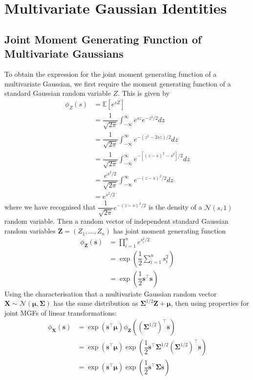 \documentclass[11pt]{report} %
\begin{document}
\section{Multivariate Gaussian Identities}

\subsection{Joint Moment Generating Function of Multivariate Gaussians}

To obtain the expression for the joint moment generating function of a multivariate Gaussian, we first require the moment generating function of a standard Gaussian random variable $Z$. This is given by
\begin{align}
\phi_{Z}\left(s\right) &= \mathbb{E}\left[e^{sZ}\right] \\
&= \dfrac{1}{\sqrt{2\pi}}\int_{-\infty}^{\infty}e^{sz}e^{-z^{2}/2}dz \\
&= \dfrac{1}{\sqrt{2\pi}}\int_{-\infty}^{\infty}e^{-\left(z^{2} - 2sz\right)/2}dz \\
&= \dfrac{1}{\sqrt{2\pi}}\int_{-\infty}^{\infty}e^{-\left[\left(z - s\right)^{2} - s^{2}\right]/2}dz \\
&= \dfrac{e^{s^{2}/2}}{\sqrt{2\pi}}\int_{-\infty}^{\infty}e^{-\left(z - s\right)^{2}/2}dz \\
&= e^{s^{2}/2}
\end{align}
where we have recognised that $\dfrac{1}{\sqrt{2\pi}}e^{-\left(z - s\right)^{2}/2}$ is the density of a $\mathcal{N}\left(s, 1\right)$ random variable. Then a random vector of independent standard Gaussian random variables $\mathbf{Z} = \left(Z_{1}, \dots, Z_{n}\right)$ has joint moment generating function
\begin{align}
\phi_{\mathbf{Z}}\left(\mathbf{s}\right) &= \prod_{i = 1}^{n}e^{s_{i}^{2}/2} \\
&= \exp\left(\dfrac{1}{2}\sum_{i = 1}^{n}s_{i}^{2}\right) \\
&= \exp\left(\dfrac{1}{2}\mathbf{s}^{\top}\mathbf{s}\right)
\end{align}
Using the characterisation that a multivariate Gaussian random vector $\mathbf{X} \sim \mathcal{N}\left(\boldsymbol{\mu}, \boldsymbol{\Sigma}\right)$ has the same distribution as $\boldsymbol{\Sigma}^{1/2}\mathbf{Z} + \boldsymbol{\mu}$, then using properties for joint MGFs of linear transformations:
\begin{align}
\phi_{\mathbf{X}}\left(\mathbf{s}\right) &= \exp\left(\mathbf{s}^{\top}\boldsymbol{\mu}\right)\phi_{\mathbf{Z}}\left(\left(\boldsymbol{\Sigma}^{1/2}\right)^{\top}\mathbf{s}\right) \\
&= \exp\left(\mathbf{s}^{\top}\boldsymbol{\mu}\right)\exp\left(\dfrac{1}{2}\mathbf{s}^{\top}\boldsymbol{\Sigma}^{1/2}\left(\boldsymbol{\Sigma}^{1/2}\right)^{\top}\mathbf{s}\right) \\
&= \exp\left(\mathbf{s}^{\top}\boldsymbol{\mu}\right)\exp\left(\dfrac{1}{2}\mathbf{s}^{\top}\boldsymbol{\Sigma}\mathbf{s}\right)
\end{align}
\end{document}

